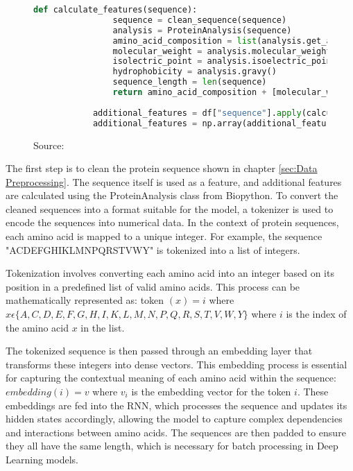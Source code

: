 \begin{figure}[bht]
    \begin{lstlisting}[language=Python]
            def calculate_features(sequence):
                sequence = clean_sequence(sequence)
                analysis = ProteinAnalysis(sequence)
                amino_acid_composition = list(analysis.get_amino_acids_percent().values())
                molecular_weight = analysis.molecular_weight()
                isolectric_point = analysis.isoelectric_point()
                hydrophobicity = analysis.gravy()
                sequence_length = len(sequence)
                return amino_acid_composition + [molecular_weight, isolectric_point, hydrophobicity, sequence_length]
    
            additional_features = df["sequence"].apply(calculate_features)
            additional_features = np.array(additional_features.tolist())
\end{lstlisting}
\caption{Source: \autocite{polleyTobiasPolDeepZyme2024}}
\end{figure}

The first step is to clean the protein sequence shown in chapter \ref{sec:Data Preprocessing}. The sequence itself is used as a feature, and additional features are calculated using the ProteinAnalysis class from Biopython. To convert the cleaned sequences into a format suitable for the model, a tokenizer is used to encode the sequences into numerical data. In the context of protein sequences, each amino acid is mapped to a unique integer. For example, the sequence "ACDEFGHIKLMNPQRSTVWY" is tokenized into a list of integers. 

Tokenization involves converting each amino acid into an integer based on its position in a predefined list of valid amino acids. This process can be mathematically represented as:
token $(x) = i $ where $ x \epsilon \{  A , C , D , E , F , G , H , I , K , L , M , N , P , Q , R , S , T , V , W , Y \}$ where $i$ is the index of the amino acid $x$ in the list.

The tokenized sequence is then passed through an embedding layer that transforms these integers into dense vectors. This embedding process is essential for capturing the contextual meaning of each amino acid within the sequence:
$embedding(i) = v$ where $v_i$ is the embedding vector for the token $i$.
These embeddings are fed into the RNN, which processes the sequence and updates its hidden states accordingly, allowing the model to capture complex dependencies and interactions between amino acids. The sequences are then padded to ensure they all have the same length, which is necessary for batch processing in Deep Learning models.

